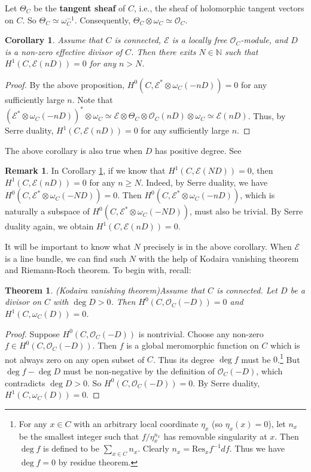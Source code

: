 \documentclass[12pt,a4paper,notitlepage]{report}
\theoremstyle{definition}
\newtheorem{rem}[df]{Remark}
\theoremstyle{plain}
\newtheorem{thm}[df]{Theorem}
\newtheorem{co}[df]{Corollary}
\newcommand{\Res}{\mathrm{Res}}
\newcommand{\scr}{\mathscr}
\numberwithin{equation}{section}
\begin{document}
Let $\Theta_C$ be the  \textbf{tangent sheaf} of $C$,  i.e., the sheaf of holomorphic tangent vectors on $C$. So $\Theta_C\simeq\omega_C^{-1}$. Consequently, $\Theta_C\otimes\omega_C\simeq\scr O_C$.


\begin{co}\label{lb6}
Assume that $C$ is connected,  $\scr E$ is a locally free $\scr O_C$-module, and  $D$ is a non-zero effective divisor of $C$. Then   there exits $N\in\mathbb N$ such that $H^1(C,\scr E(nD))=0$ for any $n> N$.
\end{co}

\begin{proof}
By the above proposition, $H^0(C,\scr E^*\otimes\omega_C(-nD))=0$ for any sufficiently large $n$. Note that $(\scr E^*\otimes\omega_C(-nD))^*\otimes\omega_C\simeq\scr E\otimes\Theta_C\otimes\scr O_C(nD)\otimes\omega_C\simeq \scr E(nD)$. Thus, by Serre duality, $H^1(C,\scr E(nD))=0$ for any sufficiently large $n$.
\end{proof}

The above corollary is also true when $D$ has positive degree. See \cite[Prop. 5.2.7]{Huy06}


\begin{rem}\label{lb128}
In Corollary \ref{lb6}, if we know that $H^1(C,\scr E(ND))=0$, then $H^1(C,\scr E(nD))=0$ for any $n\geq N$. Indeed, by Serre duality, we have $H^0(C,\scr E^*\otimes\omega_C(-ND))=0$. Then $H^0(C,\scr E^*\otimes\omega_C(-nD))$, which is naturally a subspace of $H^0(C,\scr E^*\otimes\omega_C(-ND))$, must also be trivial. By Serre duality again, we obtain $H^1(C,\scr E(nD))=0$.
\end{rem}


It will be important to know what $N$ precisely is in the above corollary. When $\scr E$ is a line bundle, we can find such $N$ with the help of Kodaira vanishing theorem and Riemann-Roch theorem. To begin with, recall:



\begin{thm}(Kodaira vanishing theorem)\label{lb64}
Assume that $C$ is connected. Let $D$ be a divisor on $C$ with $\deg D>0$. Then $H^0(C,\scr O_C(-D))=0$ and $H^1(C,\omega_C(D))=0$.
\end{thm}

\begin{proof}
Suppose $H^0(C,\scr O_C(-D))$ is nontrivial.  Choose any non-zero $f\in H^0(C,\scr O_C(-D))$. Then $f$ is a global meromorphic function on $C$ which is not always zero on any open subset of $C$. Thus its degree $\deg f$ must be $0$.\footnote{For any $x\in C$ with an arbitrary local coordinate $\eta_x$ (so $\eta_x(x)=0$), let $n_x$ be the smallest integer such that $f/\eta_x^{n_x}$ has removable singularity at $x$. Then $\deg f$ is defined to be $\sum_{x\in C} n_x$. Clearly $n_x=\Res_x f^{-1}df$. Thus we have $\deg f=0$ by residue theorem.} But $\deg f-\deg D$ must be non-negative by the definition of $\scr O_C(-D)$, which contradicts $\deg D>0$. So $H^0(C,\scr O_C(-D))=0$. By Serre duality, $H^1(C,\omega_C(D))=0$.
\end{proof}
\end{document}
